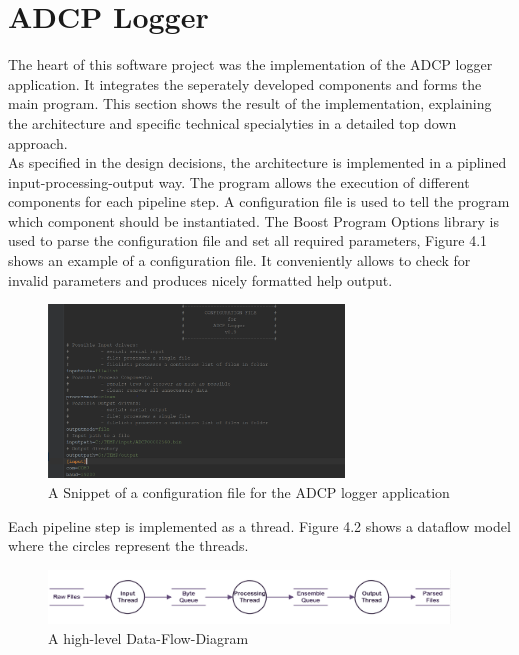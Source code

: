 \section{ADCP Logger}
The heart of this software project was the implementation of the ADCP logger application. It integrates the seperately developed components and forms the main program. This section shows the result of the implementation, explaining the architecture and specific technical specialyties in a detailed top down approach.\\
As specified in the design decisions, the architecture is implemented in a piplined input-processing-output way. The program allows the execution of different components for each pipeline step. A configuration file is used to tell the program which component should be instantiated. The Boost Program Options library is used to parse the configuration file and set all required parameters, Figure 4.1 shows an example of a configuration file. It conveniently allows to check for invalid parameters and produces nicely formatted help output.\\
\begin{figure}[h]
\centering
      \includegraphics[width=0.7\textwidth]{config}
        \caption{A Snippet of a configuration file for the ADCP logger application}
\end{figure}

Each pipeline step is implemented as a thread. Figure 4.2 shows a dataflow model where the circles represent the threads. 
\begin{figure}[h]
\centering
      \includegraphics[width=0.95\textwidth]{dfd}
        \caption{A high-level Data-Flow-Diagram }
\end{figure}

